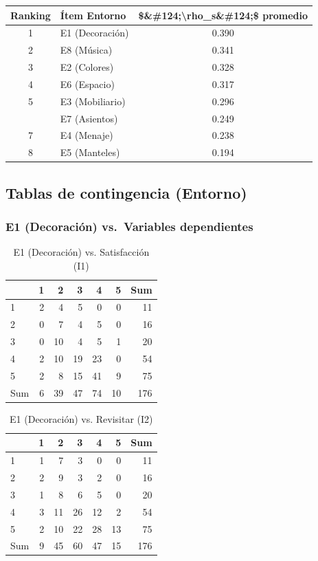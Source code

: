 \documentclass[
  spanish,
]{article}
\begin{document}
\begin{longtable}[t]{clc}
\toprule
Ranking & Ítem Entorno & \$\&\#124;\textbackslash{}rho\_s\&\#124;\$ promedio\\
\midrule
1 & E1 (Decoración) & 0.390\\
2 & E8 (Música) & 0.341\\
3 & E2 (Colores) & 0.328\\
4 & E6 (Espacio) & 0.317\\
5 & E3 (Mobiliario) & 0.296\\
\addlinespace
6 & E7 (Asientos) & 0.249\\
7 & E4 (Menaje) & 0.238\\
8 & E5 (Manteles) & 0.194\\
\bottomrule
\end{longtable}

\newpage

\subsection{Tablas de contingencia
(Entorno)}\label{tablas-de-contingencia-entorno}

\subsubsection{E1 (Decoración) vs.~Variables
dependientes}\label{e1-decoraciuxf3n-vs.-variables-dependientes}

\begin{longtable}[t]{lrrrrrr}
\caption{\label{tab:cont-e1-satisf}E1 (Decoración) vs. Satisfacción (I1)}\\
\toprule
 & 1 & 2 & 3 & 4 & 5 & Sum\\
\midrule
1 & 2 & 4 & 5 & 0 & 0 & 11\\
2 & 0 & 7 & 4 & 5 & 0 & 16\\
3 & 0 & 10 & 4 & 5 & 1 & 20\\
4 & 2 & 10 & 19 & 23 & 0 & 54\\
5 & 2 & 8 & 15 & 41 & 9 & 75\\
\addlinespace
Sum & 6 & 39 & 47 & 74 & 10 & 176\\
\bottomrule
\end{longtable}

\begin{longtable}[t]{lrrrrrr}
\caption{\label{tab:cont-e1-revis}E1 (Decoración) vs. Revisitar (I2)}\\
\toprule
 & 1 & 2 & 3 & 4 & 5 & Sum\\
\midrule
1 & 1 & 7 & 3 & 0 & 0 & 11\\
2 & 2 & 9 & 3 & 2 & 0 & 16\\
3 & 1 & 8 & 6 & 5 & 0 & 20\\
4 & 3 & 11 & 26 & 12 & 2 & 54\\
5 & 2 & 10 & 22 & 28 & 13 & 75\\
\addlinespace
Sum & 9 & 45 & 60 & 47 & 15 & 176\\
\bottomrule
\end{longtable}
\end{document}
